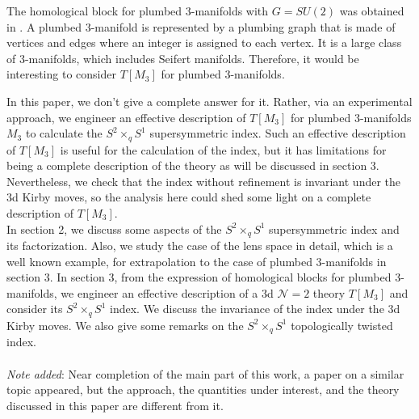 \documentclass[11pt,hyper,a4paper]{article}
\begin{document}
The homological block for plumbed 3-manifolds with $G=SU(2)$ was obtained in \cite{Gukov-Pei-Putrov-Vafa}.
A plumbed 3-manifold is represented by a plumbing graph that is made of vertices and edges where an integer is assigned to each vertex.
It is a large class of 3-manifolds, which includes Seifert manifolds.
Therefore, it would be interesting to consider $T[M_3]$ for plumbed 3-manifolds.


In this paper, we don't give a complete answer for it.
Rather, via an experimental approach, we engineer an effective description of $T[M_3]$ for plumbed 3-manifolds $M_3$ to calculate the $S^2 \times_q S^1$ supersymmetric index. 
Such an effective description of $T[M_3]$ is useful for the calculation of the index, but it has limitations for being a complete description of the theory as will be discussed in section 3.
Nevertheless, we check that the index without refinement is invariant under the 3d Kirby moves, so the analysis here could shed some light on a complete description of $T[M_3]$.	\\


In section 2, we discuss some aspects of the $S^2 \times_q S^1$ supersymmetric index and its factorization.
Also, we study the case of the lens space in detail, which is a well known example, for extrapolation to the case of plumbed 3-manifolds in section 3.
In section 3, from the expression of homological blocks for plumbed 3-manifolds, we engineer an effective description of a 3d $\mathcal{N}=2$ theory $T[M_3]$ and consider its $S^2 \times_q S^1$ index.
We discuss the invariance of the index under the 3d Kirby moves.
We also give some remarks on the $S^2 \times_q S^1$ topologically twisted index.	\\
\\
\noindent \textit{Note added}: Near completion of the main part of this work, a paper \cite{Eckhard:2019jgg} on a similar topic appeared, but the approach, the quantities under interest, and the theory discussed in this paper are different from it.






















\end{document}

